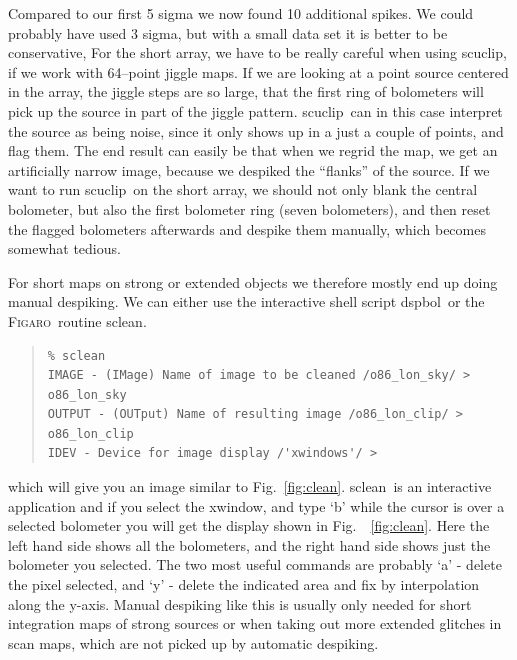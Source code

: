 \documentclass[twoside,11pt]{article}
\newenvironment{myquote}{\begin{quote}\begin{small}}{\end{small}\end{quote}}
\newcommand{\Figaro}{\xref{\textsc{Figaro}}{sun86}{}}
\newcommand{\task}[1]{\textsf{#1}}
\newcommand{\dspbol}{\xref{\task{dspbol}}{sun216}{DSPBOL}}
\newcommand{\scuclip}{\xref{\task{scuclip}}{sun216}{SCUCLIP}}
\newcommand{\sclean}{\xref{\task{sclean}}{sun86}{SCLEAN}}
\newcommand{\xref}[3]{#1}
\renewcommand{\_}{\texttt{\symbol{95}}}
\begin{document}
Compared to our first 5 sigma we now found 10 additional spikes.  We
could probably have used 3 sigma, but with a small data set it is
better to be conservative, For the short array, we have to be really
careful when using \scuclip, if we work with 64--point jiggle maps. 
If we are looking at a point source centered in the array, the jiggle
steps are so large, that the first ring of bolometers will pick up the
source in part of the jiggle pattern.  \scuclip\ can in this case
interpret the source as being noise, since it only shows up in a just
a couple of points, and flag them.  The end result can easily be that
when we regrid the map, we get an artificially narrow image, because
we despiked the ``flanks'' of the source.  If we want to run \scuclip\
on the short array, we should not only blank the central bolometer,
but also the first bolometer ring (seven bolometers), and then reset
the flagged bolometers afterwards and despike them manually, which
becomes somewhat tedious.


For short maps on strong or extended objects we therefore mostly end
up doing manual despiking.  We can either use the interactive shell
script \dspbol\ or the \Figaro\ routine \sclean.

\begin{myquote}
\begin{verbatim}
% sclean
IMAGE - (IMage) Name of image to be cleaned /o86_lon_sky/ > 
o86_lon_sky
OUTPUT - (OUTput) Name of resulting image /o86_lon_clip/ > 
o86_lon_clip
IDEV - Device for image display /'xwindows'/ >
\end{verbatim}
\end{myquote}

which will give you an image similar to Fig.\  \ref{fig:clean}. 
\sclean\ is an interactive application and if you select the xwindow,
and type `b' while the cursor is over a selected bolometer you will
get the display shown in Fig.\  \ \ref{fig:clean}.  Here the left hand
side shows all the bolometers, and the right hand side shows just the
bolometer you selected.  The two most useful commands are probably `a'
- delete the pixel selected, and `y' - delete the indicated area and
fix by interpolation along the y-axis.  Manual despiking like this is
usually only needed for short integration maps of strong sources or
when taking out more extended glitches in scan maps, which are not
picked up by automatic despiking.
\end{document}
